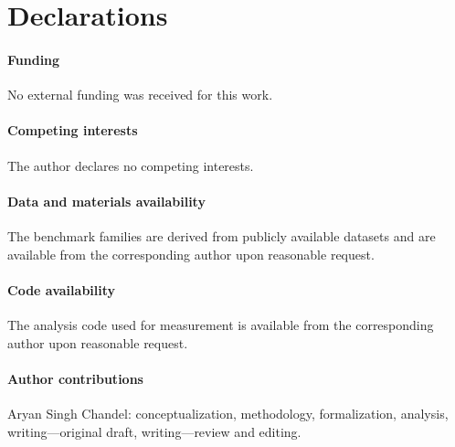 \documentclass{svjour3}
\begin{document}
\section*{Declarations}
\paragraph{Funding} No external funding was received for this work.
\paragraph{Competing interests} The author declares no competing interests.
\paragraph{Data and materials availability} The benchmark families are derived from publicly available datasets and are available from the corresponding author upon reasonable request.
\paragraph{Code availability} The analysis code used for measurement is available from the corresponding author upon reasonable request.
\paragraph{Author contributions} Aryan Singh Chandel: conceptualization, methodology, formalization, analysis, writing---original draft, writing---review and editing.



\end{document}
